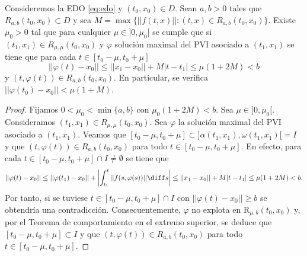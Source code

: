 \begin{lemma}
  Consideremos la EDO \eqref{eq:edo} y $(t_0, x_0) \in D$. Sean $a, b > 0$ tales que
  $R_{a,b}(t_0, x_0) \subset D$ y sea $M = \max \{||f(t,x)|| : (t,x) \in R_{a,b}(t_0,
  x_0)\}$. Existe $\mu_0 > 0$ tal que para cualquier $\mu \in ]0,\mu_0[$ se cumple que si
  $(t_1, x_1) \in R_{\mu,\mu}(t_0, x_0)$ y $\varphi$ solución maximal del PVI asociado a
  $(t_1, x_1)$ se tiene que para cada $t \in [t_0- \mu, t_0+\mu]$
  \[ ||\varphi(t) - x_0|| \le ||x_1 - x_0 || + M |t - t_1| \le \mu(1+2M) < b \] y
  $(t, \varphi(t)) \in R_{a,b}(t_0,x_0)$. En particular, se verifica
  $||\varphi(t_0)-x_0|| < \mu(1+M)$.
\end{lemma}
\begin{proof}
  Fijamos $0 < \mu_0 < \min \{a,b\}$ con $\mu_0(1+2M) < b$. Sea $\mu \in ]0,\mu_0[$. Consideramos
  $(t_1, x_1) \in R_{\mu,\mu}(t_0, x_0)$. Sea $\varphi$ la solución maximal del PVI asociado a
  $(t_1, x_1)$. Veamos que $[t_0- \mu, t_0+\mu] \subset ]\alpha(t_1,x_1), \omega(t_1,x_1)[ = I$ y
  que $(t,\varphi(t)) \in R_{a,b}(t_0,x_0)$ para todo $t \in [t_0-\mu,t_0+\mu]$. En efecto, para
  cada $t \in [t_0- \mu, t_0+\mu] \cap I \ne \emptyset$ se tiene que
  \[ ||\varphi(t)-x_0|| \le ||\varphi(t_1)-x_0|| + \left|\int_{t_1}^{t} ||f(s,\varphi(s))|| \diff
      s\right| \le ||x_1-x_0|| + M |t-t_1| \le \mu(1+2M) < b.\] Por tanto, si se tuviese
  $t \in [t_0-\mu,t_0+\mu] \cap I$ con $||\varphi(t)-x_0|| \ge b$ se obtendría una
  contradicción. Consecuentemente, $\varphi$ no explota en $\mathrm{R}_{\mu,b}(t_0, x_0)$ y, por el
  Teorema de comportamiento en el extremo superior, se deduce que $[t_0-\mu, t_0+\mu] \subset I$ y
  que $(t,\varphi(t)) \in R_{a,b}(t_0,x_0)$ para todo $t \in [t_0-\mu,t_0+\mu]$.
\end{proof}

